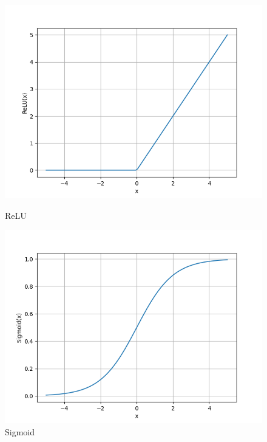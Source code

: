 \begin{figure}[ht]
    \centering
    \begin{minipage}[t]{0.3\linewidth}
        \includegraphics[width=\linewidth]{Rozdziały/02.Podstawy_teoretyczne/Obrazy/relu.png}
        \caption{ReLU}
        \label{fig:image14}
    \end{minipage}
    \hspace{0.5cm}
    \begin{minipage}[t]{0.3\linewidth}
        \includegraphics[width=\linewidth]{Rozdziały/02.Podstawy_teoretyczne/Obrazy/sigmoid.png}
        \caption{Sigmoid}
        \label{fig:image15}
    \end{minipage}
    \hspace{0.5cm}

\end{figure}
